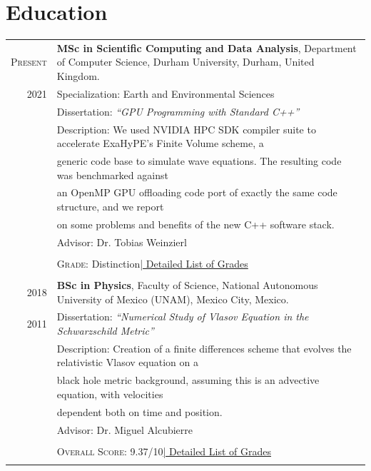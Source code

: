 \documentclass[a4paper,10pt]{article} %
\begin{document}
\section{Education}
\bigskip
\begin{tabular}{r|p{14.5cm}}	
	
	\textsc{Present} & \textbf{MSc in Scientific Computing and Data Analysis}, Department of Computer Science, Durham University, \small Durham, United Kingdom.\\
	\textsc{2021} & Specialization: Earth and Environmental Sciences\\
	& Dissertation: \emph{``GPU Programming with Standard C++''}\\ 
	& \small Description: We used NVIDIA HPC SDK compiler suite to accelerate ExaHyPE's Finite Volume scheme, a\\
	&\hspace{1.7cm} \small generic code base to simulate wave equations. The resulting code was benchmarked against\\
	&\hspace{1.7cm} an OpenMP GPU offloading code port of exactly the same code structure, and we report\\
	&\hspace{1.7cm} on some problems and benefits of the new C++ software stack.\\
	& \small Advisor: Dr. Tobias Weinzierl\\
	& \\
	&\normalsize \textsc{Grade}: Distinction\hyperlink{grdsmsc}{\hfill | \footnotesize Detailed List of Grades}\\
	\multicolumn{2}{c}{}\\

	
	\textsc{2018} & \textbf{BSc in Physics}, Faculty of Science, National Autonomous University of Mexico (UNAM), \small Mexico City, Mexico.\\
	\textsc{2011} & Dissertation: \emph{``Numerical Study of Vlasov Equation in the Schwarzschild Metric''}\\
	&\small Description: Creation of a finite differences scheme that evolves the relativistic Vlasov equation on a\\
	&\hspace{1.7cm} \small black hole metric background, assuming this is an advective equation, with velocities \\
	&\hspace{1.7cm} \small dependent both on time and position.\\
	& \small Advisor: Dr. Miguel Alcubierre\\
	& \\
	&\normalsize \textsc{Overall Score}: 9.37/10\hyperlink{grdsbach}{\hfill | \footnotesize Detailed List of Grades}\\
	\multicolumn{2}{c}{}\\
	
	
\end{tabular}
\end{document}
